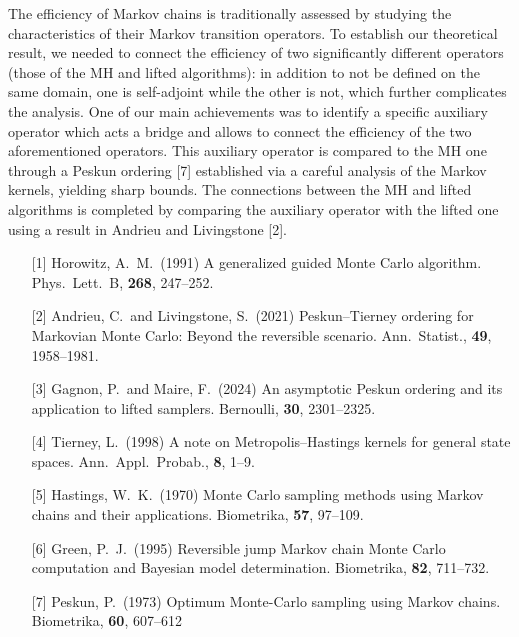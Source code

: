 \begin{talk}
The efficiency of Markov chains is traditionally assessed by studying the characteristics of their Markov transition operators. To establish our theoretical result, we needed to connect the efficiency of two significantly different operators (those of the MH and lifted algorithms): in addition to not be defined on the same domain, one is self-adjoint while the other is not, which further complicates the analysis. One of our main achievements was to identify a specific auxiliary operator which acts a bridge and allows to connect the efficiency of the two aforementioned operators. This auxiliary operator is compared to the MH one through a Peskun ordering [7] established via a careful analysis of the Markov kernels, yielding sharp bounds. The connections between the MH and lifted algorithms is completed by comparing the auxiliary operator with the lifted one using a result in Andrieu and Livingstone [2].

\medskip

\begin{enumerate}
	\item[{[1]}] Horowitz, A.\ M.\ (1991) A generalized guided Monte Carlo algorithm. Phys.\ Lett.\ B, \textbf{268}, 247--252.
	\item[{[2]}] Andrieu, C.\ and Livingstone, S.\ (2021) Peskun--Tierney ordering for Markovian Monte Carlo: Beyond the reversible scenario. Ann.\ Statist., \textbf{49}, 1958--1981.
    \item[{[3]}] Gagnon, P.\ and Maire, F.\ (2024) An asymptotic Peskun ordering and its application to lifted samplers. Bernoulli, \textbf{30}, 2301--2325.
    \item[{[4]}] Tierney, L.\ (1998) A note on Metropolis--Hastings kernels for general state spaces. Ann.\ Appl.\ Probab., \textbf{8}, 1--9.
    \item[{[5]}] Hastings, W.\ K.\ (1970) Monte Carlo sampling methods using Markov chains and their applications. Biometrika, \textbf{57}, 97--109.
    \item[{[6]}] Green, P.\ J.\ (1995) Reversible jump Markov chain Monte Carlo computation and Bayesian model determination. Biometrika, \textbf{82}, 711--732.
    \item[{[7]}] Peskun, P.\ (1973) Optimum Monte-Carlo sampling using Markov chains. Biometrika, \textbf{60}, 607--612
\end{enumerate}


\end{talk}
